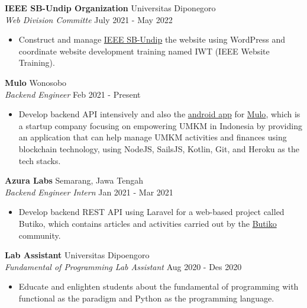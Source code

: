\documentclass[a4paper]{article}
\begin{document}
\textbf{IEEE SB-Undip Organization} \hfill Universitas Diponegoro\\
\textit{Web Division Committe} \hfill July 2021 - May 2022\\
\vspace{-1mm}
\begin{itemize} \itemsep 1pt
	\item Construct and manage \href{https://edu.ieee.org/id-undip/}{IEEE SB-Undip} the website using WordPress and coordinate website development training named IWT (IEEE Website Training).
\end{itemize}

\textbf{Mulo} \hfill Wonosobo \\
\textit{Backend Engineer} \hfill Feb 2021 - Present\\
\vspace{-1mm}
\begin{itemize} \itemsep 1pt
	\item Develop backend API intensively and also the \href{https://play.google.com/store/apps/details?id=app.mulo}{android app} for \href{https://muloapp.id/}{Mulo}, which is a startup company focusing on empowering UMKM in Indonesia by providing an application that can help manage UMKM activities and finances using blockchain technology, using NodeJS, SailsJS, Kotlin, Git, and Heroku as the tech stacks.
\end{itemize}

\textbf{Azura Labs} \hfill Semarang, Jawa Tengah\\
\textit{Backend Engineer Intern} \hfill Jan 2021 - Mar 2021\\
\vspace{-1mm}
\begin{itemize} \itemsep 1pt
	\item Develop backend REST API using Laravel for a web-based project called \textquotesingle{}Butiko\textquotesingle{}, which contains articles and activities carried out by the \textquotesingle{}\href{https://butiko.id/}{Butiko}\textquotesingle{} community.
\end{itemize}

\textbf{Lab Assistant} \hfill Universitas Dipoengoro\\
\textit{Fundamental of Programming Lab Assistant} \hfill Aug 2020 - Des 2020\\
\vspace{-1mm}
\begin{itemize} \itemsep 1pt
	\item Educate and enlighten students about the fundamental of programming with functional as the paradigm and Python as the programming language.
\end{itemize}
\end{document}
